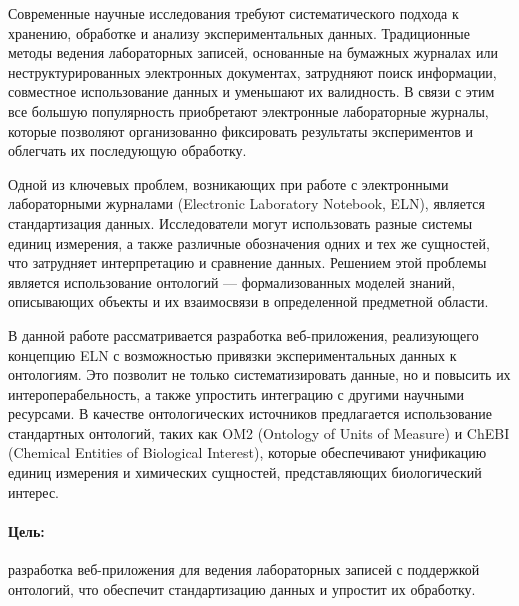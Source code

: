 
Современные научные исследования требуют систематического подхода к хранению, обработке и анализу экспериментальных данных. Традиционные методы ведения лабораторных записей, основанные на бумажных журналах или неструктурированных электронных документах, затрудняют поиск информации, совместное использование данных и уменьшают их валидность. В связи с этим все большую популярность приобретают электронные лабораторные журналы, которые позволяют организованно фиксировать результаты экспериментов и облегчать их последующую обработку.

Одной из ключевых проблем, возникающих при работе с электронными лабораторными журналами (Electronic Laboratory Notebook, ELN), является стандартизация данных. Исследователи могут использовать разные системы единиц измерения, а также различные обозначения одних и тех же сущностей, что затрудняет интерпретацию и сравнение данных. Решением этой проблемы является использование онтологий — формализованных моделей знаний, описывающих объекты и их взаимосвязи в определенной предметной области.

В данной работе рассматривается разработка веб-приложения, реализующего концепцию ELN с возможностью привязки экспериментальных данных к онтологиям. Это позволит не только систематизировать данные, но и повысить их интероперабельность, а также упростить интеграцию с другими научными ресурсами. В качестве онтологических источников предлагается использование стандартных онтологий, таких как OM2 (Ontology of Units of Measure) и ChEBI (Chemical Entities of Biological Interest), которые обеспечивают унификацию единиц измерения и химических сущностей, представляющих биологический интерес.

\paragraph*{Цель:} разработка веб-приложения для ведения лабораторных записей с поддержкой онтологий, что обеспечит стандартизацию данных и упростит их обработку.

